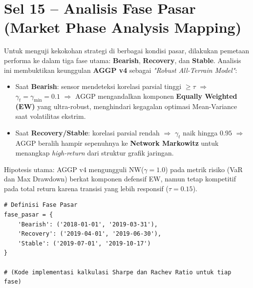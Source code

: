 \documentclass[12pt,a4paper]{article}
\begin{document}
\section{Sel 15 -- Analisis Fase Pasar (Market Phase Analysis Mapping)}
Untuk menguji kekokohan strategi di berbagai kondisi pasar, dilakukan pemetaan performa ke dalam tiga fase utama: \textbf{Bearish}, \textbf{Recovery}, dan \textbf{Stable}. Analisis ini membuktikan keunggulan \textbf{AGGP v4} sebagai \textit{"Robust All-Terrain Model"}:
\begin{itemize}
    \item Saat \textbf{Bearish}: sensor mendeteksi korelasi parsial tinggi $\geq \tau$ $\Rightarrow$ $\gamma_t = \gamma_{\min} = 0.1$ $\Rightarrow$ AGGP mengandalkan komponen \textbf{Equally Weighted (EW)} yang ultra-robust, menghindari kegagalan optimasi Mean-Variance saat volatilitas ekstrim.
    \item Saat \textbf{Recovery/Stable}: korelasi parsial rendah $\Rightarrow$ $\gamma_t$ naik hingga $0.95$ $\Rightarrow$ AGGP beralih hampir sepenuhnya ke \textbf{Network Markowitz} untuk menangkap \textit{high-return} dari struktur grafik jaringan.
\end{itemize}
Hipotesis utama: AGGP v4 mengungguli NW($\gamma=1.0$) pada metrik risiko (VaR dan Max Drawdown) berkat komponen defensif EW, namun tetap kompetitif pada total return karena transisi yang lebih responsif ($\tau = 0.15$).

\begin{lstlisting}[caption={Kalkulasi Metrik Berdasarkan Fase Pasar}]
# Definisi Fase Pasar
fase_pasar = {
    'Bearish': ('2018-01-01', '2019-03-31'),
    'Recovery': ('2019-04-01', '2019-06-30'),
    'Stable': ('2019-07-01', '2019-10-17')
}

# (Kode implementasi kalkulasi Sharpe dan Rachev Ratio untuk tiap fase)
\end{lstlisting}
\end{document}
